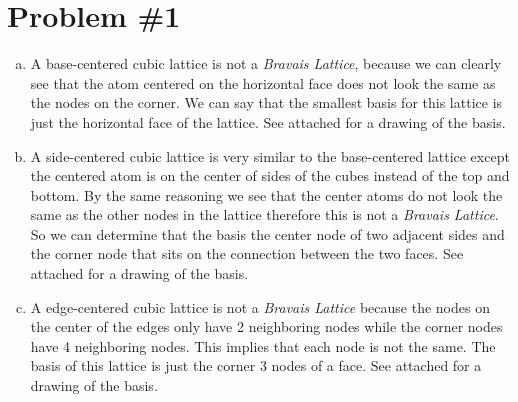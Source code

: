 \documentclass[11pt]{article}
\numberwithin{equation}{section}
\begin{document}


\section{Problem \#1}
\begin{enumerate}[(a)]
\item
A base-centered cubic lattice is not a \emph{Bravais Lattice}, because we can clearly see that the atom centered on the horizontal face does not look the same as the nodes on the corner. We can say that the smallest basis for this lattice is just the horizontal face of the lattice. See attached for a drawing of the basis.

\item
A side-centered cubic lattice is very similar to the base-centered lattice except the centered atom is on the center of sides of the cubes instead of the top and bottom. By the same reasoning we see that the center atoms do not look the same as the other nodes in the lattice therefore this is not a \emph{Bravais Lattice}. So we can determine that the basis the center node of two adjacent sides and the corner node that sits on the connection between the two faces. See attached for a drawing of the basis.

\item
A edge-centered cubic lattice is not a \emph{Bravais Lattice} because the nodes on the center of the edges only have 2 neighboring nodes while the corner nodes have 4 neighboring nodes. This implies that each node is not the same. The basis of this lattice is just the corner 3 nodes of a face. See attached for a drawing of the basis.
\end{enumerate}
\end{document}
